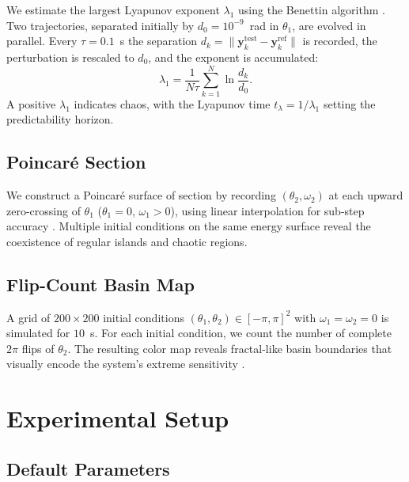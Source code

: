 \documentclass[11pt,a4paper]{article}
\newcommand{\vect}[1]{\boldsymbol{#1}}
\begin{document}
We estimate the largest Lyapunov exponent $\lambda_1$ using the Benettin
algorithm \citep{benettin1980lyapunov,skokos2010lyapunov}. Two trajectories,
separated initially by $d_0 = 10^{-9}$~rad in $\theta_1$, are evolved in
parallel. Every $\tau = 0.1$~s the separation $d_k = \|\vect{y}_k^{\text{test}}
- \vect{y}_k^{\text{ref}}\|$ is recorded, the perturbation is rescaled to $d_0$,
and the exponent is accumulated:
\begin{equation}
  \lambda_1 = \frac{1}{N\tau}\sum_{k=1}^{N}\ln\frac{d_k}{d_0}.
  \label{eq:lyapunov}
\end{equation}
A positive $\lambda_1$ indicates chaos, with the Lyapunov time
$t_\lambda = 1/\lambda_1$ setting the predictability horizon.

\subsection{Poincar\'e Section}

We construct a Poincar\'e surface of section by recording $(\theta_2, \omega_2)$
at each upward zero-crossing of $\theta_1$ ($\theta_1 = 0$, $\omega_1 > 0$),
using linear interpolation for sub-step accuracy
\citep{stachowiak2006numerical}. Multiple initial conditions on the same
energy surface reveal the coexistence of regular islands and chaotic regions.

\subsection{Flip-Count Basin Map}

A grid of $200 \times 200$ initial conditions $(\theta_1, \theta_2) \in
[-\pi,\pi]^2$ with $\omega_1 = \omega_2 = 0$ is simulated for $10$~s. For
each initial condition, we count the number of complete $2\pi$ flips of
$\theta_2$. The resulting color map reveals fractal-like basin boundaries
that visually encode the system's extreme sensitivity
\citep{shinbrot1992chaos}.

\section{Experimental Setup}\label{sec:setup}

\subsection{Default Parameters}
\end{document}
